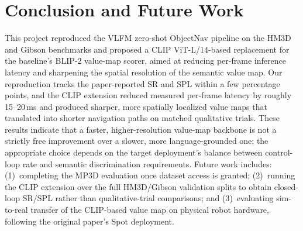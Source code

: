 \documentclass[conference]{IEEEtran}
\begin{document}
\section{Conclusion and Future Work}
This project reproduced the VLFM zero-shot ObjectNav pipeline on the HM3D and Gibson benchmarks and proposed a CLIP ViT-L/14-based replacement for the baseline's BLIP-2 value-map scorer, aimed at reducing per-frame inference latency and sharpening the spatial resolution of the semantic value map. Our reproduction tracks the paper-reported SR and SPL within a few percentage points, and the CLIP extension reduced measured per-frame latency by roughly 15--20\,ms and produced sharper, more spatially localized value maps that translated into shorter navigation paths on matched qualitative trials. These results indicate that a faster, higher-resolution value-map backbone is not a strictly free improvement over a slower, more language-grounded one; the appropriate choice depends on the target deployment's balance between control-loop rate and semantic discrimination requirements. Future work includes: (1)~completing the MP3D evaluation once dataset access is granted; (2)~running the CLIP extension over the full HM3D/Gibson validation splits to obtain closed-loop SR/SPL rather than qualitative-trial comparisons; and (3)~evaluating sim-to-real transfer of the CLIP-based value map on physical robot hardware, following the original paper's Spot deployment.
\end{document}
